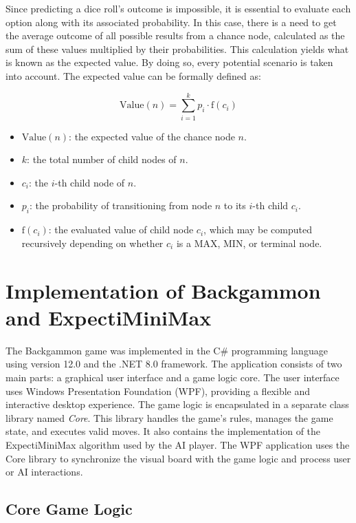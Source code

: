 Since predicting a dice roll's outcome is impossible, it is essential to evaluate each option along with its associated probability. In this case, there is a need to get the average outcome of all possible results from a chance node, calculated as the sum of these values multiplied by their probabilities. This calculation yields what is known as the expected value. By doing so, every potential scenario is taken into account. The expected value can be formally defined as:

\[
\text{Value}(n) = \sum_{i=1}^{k} p_i \cdot \text{f}(c_i)
\]

\begin{itemize}
  \item $\text{Value}(n)$: the expected value of the chance node $n$.
  \item $k$: the total number of child nodes of $n$.
  \item $c_i$: the $i$-th child node of $n$.
  \item $p_i$: the probability of transitioning from node $n$ to its $i$-th child $c_i$.
  \item $\text{f}(c_i)$: the evaluated value of child node $c_i$, which may be computed recursively depending on whether $c_i$ is a MAX, MIN, or terminal node.
\end{itemize}





\chapter{Implementation of Backgammon and ExpectiMiniMax}\label{Implementation}

The Backgammon game was implemented in the C\# programming language using version 12.0 and the .NET 8.0 framework. The application consists of two main parts: a graphical user interface and a game logic core. The user interface uses Windows Presentation Foundation (WPF), providing a flexible and interactive desktop experience. The game logic is encapsulated in a separate class library named \textit{Core}. This library handles the game's rules, manages the game state, and executes valid moves. It also contains the implementation of the ExpectiMiniMax algorithm used by the AI player. The WPF application uses the Core library to synchronize the visual board with the game logic and process user or AI interactions.

\section{Core Game Logic}

